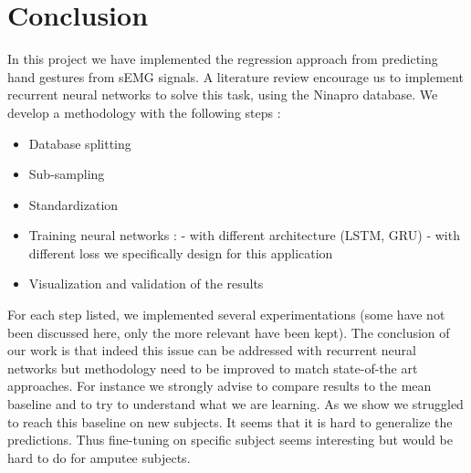 \documentclass[final]{cvpr}
\begin{document}
\section{Conclusion}
In this project we have implemented the regression approach from predicting hand gestures from sEMG signals. A literature review encourage us to implement recurrent neural networks to solve this task, using the Ninapro database. We develop a methodology with the following steps : 
\begin{itemize}
    \item Database splitting 
    \item Sub-sampling
    \item Standardization
    \item Training neural networks :
    \subitem - with different architecture (LSTM, GRU)
    \subitem - with different loss we specifically design for this application
    \item Visualization and validation of the results
\end{itemize}
For each step listed, we implemented several experimentations (some have not been discussed here, only the more relevant have been kept). The conclusion of our work is that indeed this issue can be addressed with recurrent neural networks but methodology need to be improved to match state-of-the art approaches. For instance we strongly advise to compare results to the mean baseline and to try to understand what we are learning. As we show we struggled to reach this baseline on new subjects. It seems that it is hard to generalize the predictions. Thus fine-tuning on specific subject seems interesting but would be hard to do for amputee subjects.


{\small


}
\end{document}
